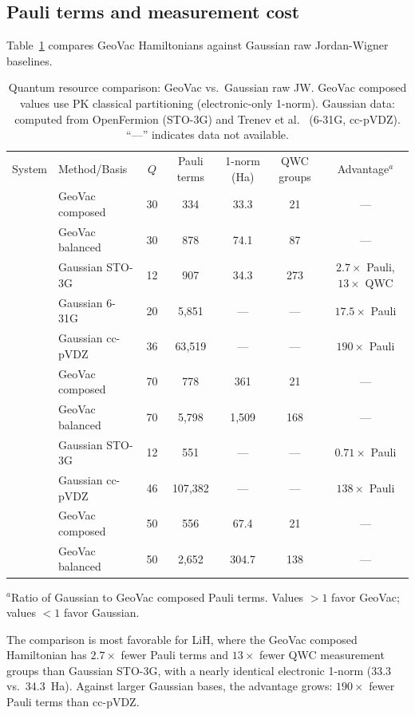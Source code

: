 \documentclass[twocolumn,pra,amsmath,amssymb,superscriptaddress]{revtex4-2}
\begin{document}
\subsection{Pauli terms and measurement cost}

Table~\ref{tab:resources} compares GeoVac Hamiltonians against
Gaussian raw Jordan-Wigner baselines.

\begin{table}[t]
\caption{Quantum resource comparison: GeoVac vs.\ Gaussian raw JW.
  GeoVac composed values use PK classical partitioning
  (electronic-only 1-norm). Gaussian data: computed from
  OpenFermion (STO-3G) and Trenev et al.~\cite{Trenev2025}
  (6-31G, cc-pVDZ).  ``---'' indicates data not available.}
\label{tab:resources}
\begin{ruledtabular}
\begin{tabular}{llccccc}
System & Method/Basis & $Q$ & Pauli terms & 1-norm (Ha)
  & QWC groups & Advantage$^a$ \\
\colrule
\multirow{5}{*}{LiH}
 & GeoVac composed & 30 & 334 & 33.3 & 21 & --- \\
 & GeoVac balanced & 30 & 878 & 74.1 & 87 & --- \\
 & Gaussian STO-3G & 12 & 907 & 34.3 & 273 & $2.7\times$ Pauli, $13\times$ QWC \\
 & Gaussian 6-31G  & 20 & 5{,}851 & --- & --- & $17.5\times$ Pauli \\
 & Gaussian cc-pVDZ & 36 & 63{,}519 & --- & --- & $190\times$ Pauli \\
\colrule
\multirow{4}{*}{H$_2$O}
 & GeoVac composed & 70 & 778 & 361 & 21 & --- \\
 & GeoVac balanced & 70 & 5{,}798 & 1{,}509 & 168 & --- \\
 & Gaussian STO-3G & 12 & 551 & --- & --- & $0.71\times$ Pauli \\
 & Gaussian cc-pVDZ & 46 & 107{,}382 & --- & --- & $138\times$ Pauli \\
\colrule
\multirow{2}{*}{BeH$_2$}
 & GeoVac composed & 50 & 556 & 67.4 & 21 & --- \\
 & GeoVac balanced & 50 & 2{,}652 & 304.7 & 138 & --- \\
\end{tabular}
\end{ruledtabular}
\raggedright\footnotesize{$^a$Ratio of Gaussian to GeoVac composed Pauli terms.
Values $> 1$ favor GeoVac; values $< 1$ favor Gaussian.}
\end{table}

The comparison is most favorable for LiH, where the GeoVac composed
Hamiltonian has $2.7\times$ fewer Pauli terms and $13\times$ fewer
QWC measurement groups than Gaussian STO-3G, with a nearly identical
electronic 1-norm (33.3 vs.\ 34.3~Ha).  Against larger Gaussian bases,
the advantage grows: $190\times$ fewer Pauli terms than cc-pVDZ.
\end{document}
